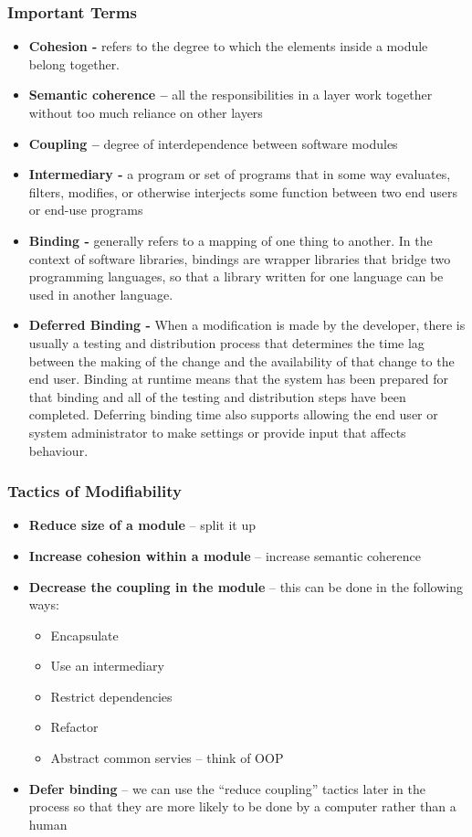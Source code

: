 \documentclass[a4paper]{article}
\begin{document}
\subsubsection{Important Terms}
\begin{itemize}
\item \textbf{Cohesion -} refers to the degree to which the elements inside a module belong together.
\item \textbf{Semantic coherence –} all the responsibilities in a layer work together without too much reliance on other layers
\item \textbf{Coupling –} degree of interdependence between software modules
\item \textbf{Intermediary -} a program or set of programs that in some way evaluates, filters, modifies, or otherwise interjects some function between two end users or end-use programs
\item \textbf{Binding -} generally refers to a mapping of one thing to another. In the context of software libraries, bindings are wrapper libraries that bridge two programming languages, so that a library written for one language can be used in another language.
\item \textbf{Deferred Binding -} When a modification is made by the developer, there is usually a testing and distribution process that determines the time lag between the making of the change and the availability of that change to the end user. Binding at runtime means that the system has been prepared for that binding and all of the testing and distribution steps have been completed. Deferring binding time also supports allowing the end user or system administrator to make settings or provide input that affects behaviour.
\end{itemize}

\subsubsection{Tactics of Modifiability}
\begin{itemize}
  \item \textbf{Reduce size of a module} – split it up
  \item \textbf{Increase cohesion within a module} – increase semantic coherence
  \item \textbf{Decrease the coupling in the module} – this can be done in the following ways:
   \begin{itemize}
   \item Encapsulate
   \item Use an intermediary
   \item Restrict dependencies
   \item Refactor
   \item Abstract common servies – think of OOP
   \end{itemize}
   \item \textbf{Defer binding} – we can use the “reduce coupling” tactics later in the process so that they   are more likely to be done by a computer rather than a human
\end{itemize}
\end{document}
